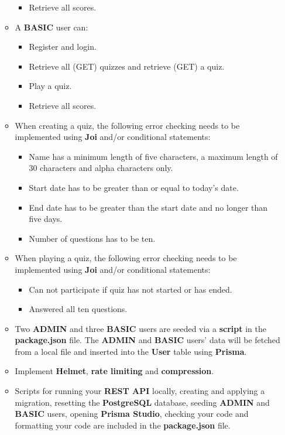 \documentclass{article}
\begin{document}
\begin{itemize}
\begin{itemize}
\begin{itemize}
			\item Retrieve all scores.
		\end{itemize}
		\item A \textbf{BASIC} user can:
		\begin{itemize}
			\item Register and login.
			\item Retrieve all (GET) quizzes and retrieve (GET) a quiz.  	
			\item Play a quiz.
			\item Retrieve all scores.
		\end{itemize}
		\item When creating a quiz, the following error checking needs to be implemented using \textbf{Joi} and/or conditional statements:
		\begin{itemize}
			\item Name has a minimum length of five characters, a maximum length of 30 characters and alpha characters only.
			\item Start date has to be greater than or equal to today's date.
			\item End date has to be greater than the start date and no longer than five days. 
			\item Number of questions has to be ten.
		\end{itemize}
		\item When playing a quiz, the following error checking needs to be implemented using \textbf{Joi} and/or conditional statements:
		\begin{itemize}
			\item Can not participate if quiz has not started or has ended.
			\item Answered all ten questions.
		\end{itemize}
		\item Two \textbf{ADMIN} and three \textbf{BASIC} users are seeded via a \textbf{script} in the \textbf{package.json} file. The \textbf{ADMIN} and \textbf{BASIC} users' data will be fetched from a local file and inserted into the \textbf{User} table using \textbf{Prisma}.  
		\item Implement \textbf{Helmet}, \textbf{rate limiting} and \textbf{compression}.
		\item Scripts for running your \textbf{REST API} locally, creating and applying a migration, resetting the \textbf{PostgreSQL} database, seeding \textbf{ADMIN} and \textbf{BASIC} users, opening \textbf{Prisma Studio}, checking your code and formatting your code are included in the \textbf{package.json} file.

\end{itemize}
\end{itemize}
\end{document}
